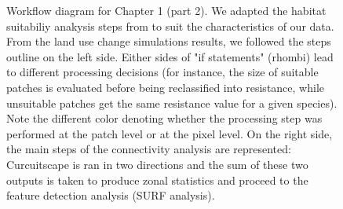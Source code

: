 \begin{figure}[h!]
\caption[Workflow diagram for Chapter 1 (part 2)]{Workflow diagram for Chapter 1 (part 2). We adapted the habitat suitabiliy anakysis steps from \cite{rayfield_priorisation_2018} to suit the characteristics of our data. From the land use change simulations results, we followed the steps outline on the left side. Either sides of "if statements" (rhombi) lead to different processing decisions (for instance, the size of suitable patches is evaluated before being reclassified into resistance, while unsuitable patches get the same resistance value for a given species). Note the different color denoting whether the processing step was performed at the patch level or at the pixel level. On the right side, the main steps of the connectivity analysis are represented: Curcuitscape is ran in two directions and the sum of these two outputs is taken to produce zonal statistics and proceed to the feature detection analysis (SURF analysis).} 
\label{fig:workflow2}
\end{figure}
\clearpage




